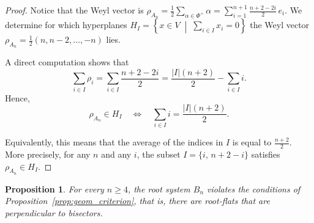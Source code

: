 \documentclass[11pt]{amsart}
\theoremstyle{plain}
\newtheorem{prop}[thm]{Proposition}
\theoremstyle{definition}
\theoremstyle{remark}
\begin{document}
\begin{proof}
		Notice that the Weyl vector is $\rho_{A_n} = \frac12 \sum_{\alpha \in \Phi^+} \alpha
		= \sum_{i=1}^{n+1} \frac{n+2-2i}{2}\, e_i$. We determine for which hyperplanes $H_I = \left\{ x \in V \;\middle|\; \sum_{i \in I} x_i = 0 \right\}$ the Weyl vector $\rho_{A_n} = \tfrac{1}{2}(n, n-2, \dots, -n)$ lies.
		
		A direct computation shows that
		\[
		\sum_{i \in I} \rho_i = \sum_{i \in I} \frac{n+2-2i}{2}
		= \frac{|I|(n+2)}{2} - \sum_{i \in I} i.
		\]
		Hence,
		\[
		\rho_{A_n} \in H_I
		\quad \Longleftrightarrow \quad
		\sum_{i \in I} i = \frac{|I|(n+2)}{2}.
		\]
		
		Equivalently, this means that the average of the indices in $I$
		is equal to $\frac{n+2}{2}$. More precisely,  for any $n$ and any $i$, the subset $I = \{i,\, n+2-i\}$
		satisfies $\rho_{A_n} \in H_I$.
	\end{proof}
	
	\begin{prop}
		\label{prop:Bn}
		For every $n\ge 4$, the root system $B_n$ violates the conditions of Proposition~\ref{prop:geom_criterion}, that is, there are root-flats that are perpendicular to bisectors.
	\end{prop}
	
\end{document}
